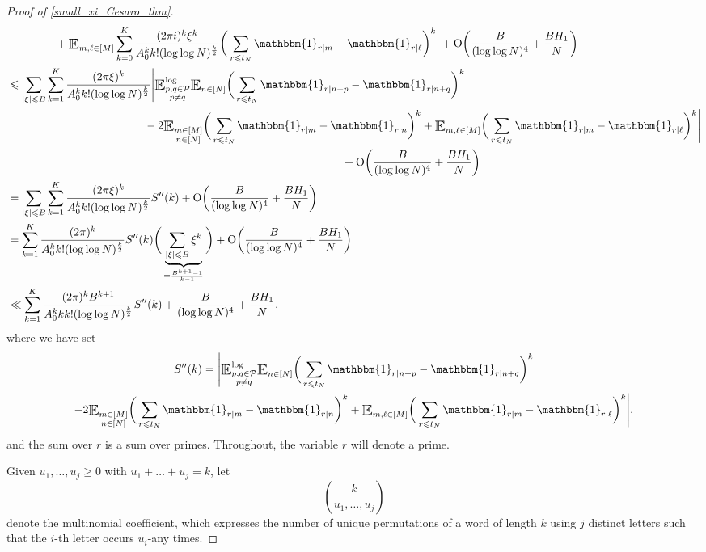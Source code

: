 \documentclass[letter,11pt]{article}
\theoremstyle{plain} %
\theoremstyle{definition} %
\theoremstyle{plain}
\theoremstyle{plain}
\theoremstyle{plain}
\numberwithin{equation}{section}
\newcommand{\Oh}{{\mathrm O}}
\renewcommand{\leq}{\leqslant}
\renewcommand{\geq}{\geqslant}
\newcommand{\E}{\raisebox{-0.4ex}{\scalebox{1.4}[1.3]{$\mathbb{E}$}}}
\newcommand{\Esub}[1]{\raisebox{-0.4ex}{\scalebox{1.4}[1.3]{$\mathbb{E}$}}\raisebox{-0.35ex}{\ensuremath{_{\scriptstyle #1}}}}
\newcommand{\logE}{{\E}^{\log}}
\newcommand{\1}{\mathbbm{1}}
\newcommand{\Pc}{\mathcal{P}}
\begin{document}
\begin{proof}[Proof of \cref{small_xi_Cesaro_thm}]
\begin{align}
& \hspace*{1.5cm}
+ \Esub{m,\ell\in[M]} \sum_{k=0}^K \frac{(2\pi i)^k \xi^k}{A_0^k k!(\log\log N)^{\frac{k}{2}}} \bigg(\sum_{r\leq t_N}\1_{r\mid m}-\1_{r\mid \ell}\bigg)^k\Bigg|
+\Oh\bigg(\frac{B}{(\log\log N)^4}+\frac{BH_1}{N}\bigg)
\notag \\
& \leq 
\sum_{|\xi|\leq B}\sum_{k=1}^K \frac{(2\pi\xi)^k}{A_0^k k! (\log\log N)^{\frac{k}{2}}}
\Bigg|
\logE_{\substack{p,q\in\Pc \\ p\neq q}} \Esub{n\in[N]} \bigg(\sum_{r\leq t_N}\1_{r\mid n+p}-\1_{r\mid n+q}\bigg)^k
\notag \\
& \hspace*{4.3cm}
- 2\Esub{\substack{m\in[M] \\ n\in[N]}}
\bigg(\sum_{r\leq t_N} \1_{r\mid m}-\1_{r\mid n}\bigg)^k
+\Esub{m,\ell\in[M]}\bigg(\sum_{r\leq t_N}\1_{r\mid m}-\1_{r\mid \ell}\bigg)^k\Bigg| \notag \\
& \hspace*{10.5cm} + \Oh\bigg(\frac{B}{(\log\log N)^4}+\frac{BH_1}{N}\bigg)
\notag \\
& = \sum_{|\xi|\leq B}\sum_{k=1}^K \frac{(2\pi\xi)^k}{A_0^k k! (\log\log N)^{\frac{k}{2}}}
S''(k) + \Oh\bigg(\frac{B}{(\log\log N)^4}+\frac{BH_1}{N}\bigg) \notag \\
& = \sum_{k=1}^K \frac{(2\pi)^k}{A_0^k k! (\log\log{N})^\frac{k}{2}}S''(k) \bigg(\underbrace{\sum_{|\xi|\leq B}\xi^k}_{=\frac{B^{k+1}-1}{k-1}}\bigg) + \Oh\bigg(\frac{B}{(\log\log N)^4}+\frac{BH_1}{N}\bigg)
\notag \\
& \ll \sum_{k=1}^K \frac{(2\pi)^k B^{k+1}}{A_0^{k} k k!(\log\log{N})^\frac{k}{2}}S''(k) + \frac{B}{(\log\log{N})^4}+\frac{BH_1}{N},
\end{align}
where we have set
\begin{multline}\label{eqn_S''_defn}
    S''(k)
    =
    \Bigg|\logE_{\substack{p,q\in\Pc \\ p\neq q}} \Esub{n\in[N]} \bigg(\sum_{r\leq t_N}\1_{r\mid n+p}-\1_{r\mid n+q}\bigg)^k \\
    - 2\Esub{\substack{m\in[M] \\ n\in[N]}}\bigg(\sum_{r\leq t_N} \1_{r\mid m}-\1_{r\mid n}\bigg)^k
    +\Esub{m,\ell\in[M]}\bigg(\sum_{r\leq t_N}\1_{r\mid m}-\1_{r\mid \ell}\bigg)^k\Bigg|,
\end{multline}
and the sum over $r$ is a sum over primes. Throughout, the variable $r$ will denote a prime.

Given $u_1,\ldots,u_j\geq 0$ with $u_1+\ldots+u_j=k$, let
\[
\binom{k}{u_1,\ldots,u_j}
\]
denote the multinomial coefficient, which expresses the number of unique permutations of a word of length $k$ using $j$ distinct letters such that the $i$-th letter occurs $u_i$-any times. 


\end{proof}
\end{document}
